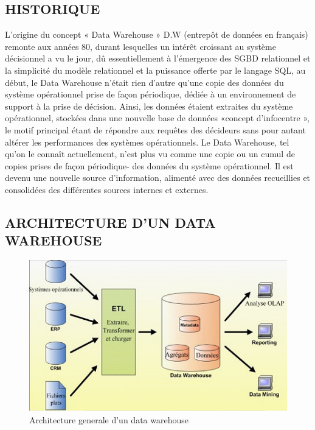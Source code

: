  \subsection{HISTORIQUE}
 	L’origine du concept « Data Warehouse » D.W (entrepôt de données en français) remonte aux années 80, durant lesquelles un intérêt croissant au système décisionnel a vu le jour, dû essentiellement à l’émergence des SGBD relationnel et la simplicité du modèle relationnel et la puissance offerte par le langage SQL, au début, le Data Warehouse n’était rien d’autre qu’une copie des données du système opérationnel prise de façon périodique, dédiée à un environnement de support à la prise de décision. Ainsi, les données étaient extraites du système opérationnel, stockées dans une nouvelle base de données «concept d’infocentre », le motif principal étant de répondre aux requêtes des décideurs sans pour autant altérer les performances des systèmes opérationnels. Le Data Warehouse, tel qu’on le connaît actuellement, n’est plus vu comme une copie ou un cumul de copies prises de façon périodique- des données du système opérationnel. Il est devenu une nouvelle source d’information, alimenté avec des données recueillies et consolidées des différentes sources internes et externes.
 
 \subsection{ARCHITECTURE D’UN DATA WAREHOUSE}
 
 	\begin{figure}[h]
	\begin{center}
		\includegraphics[scale=0.85]{images/DataWH.png}
		\caption{Architecture generale d'un data warehouse}
		\label{architecture-data-warehouse}
	\end{center}
\end{figure}

